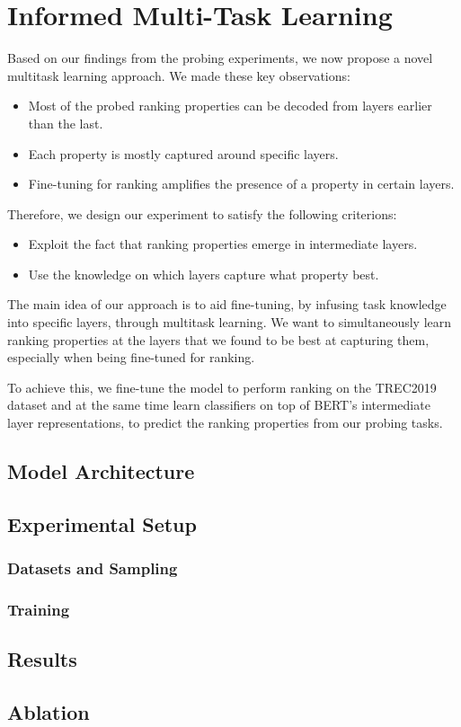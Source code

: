 \chapter{Informed Multi-Task Learning}
Based on our findings from the probing experiments, we now propose a novel multitask learning approach. We made these key observations:

\begin{itemize}
    \item Most of the probed ranking properties can be decoded from layers earlier than the last.
    \item Each property is mostly captured around specific layers.
    \item Fine-tuning for ranking amplifies the presence of a property in certain layers.
\end{itemize}

Therefore, we design our experiment to satisfy the following criterions:
\begin{itemize}
    \item Exploit the fact that ranking properties emerge in intermediate layers.
    \item Use the knowledge on which layers capture what property best.
\end{itemize}

The main idea of our approach is to aid fine-tuning, by infusing task knowledge into specific layers, through multitask learning. We want to simultaneously learn ranking properties at the layers that we found to be best at capturing them, especially when being fine-tuned for ranking.

To achieve this, we fine-tune the  model to perform ranking on the TREC2019 dataset and at the same time learn classifiers on top of BERT's intermediate layer representations, to predict the ranking properties from our probing tasks.

\section{Model Architecture}
\section{Experimental Setup}
\subsection{Datasets and Sampling}
\subsection{Training}
\section{Results}
\section{Ablation}
